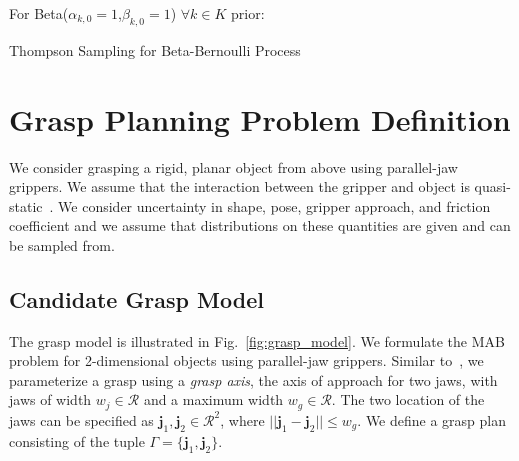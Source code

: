 \documentclass[10pt, conference]{ieeeconf}      %
\begin{document}
\begin{algorithm}
 For Beta($\alpha_{k,0}=1$,$\beta_{k,0}=1$) $\forall k \in K$ prior: \\
 \caption{Thompson Sampling for Beta-Bernoulli Process}
\end{algorithm}
\vspace{-2ex}



\section{Grasp Planning Problem Definition}
We consider grasping a rigid, planar object from above using parallel-jaw grippers.
We assume that the interaction between the gripper and object is quasi-static~\cite{kehoe2012estimating, kehoe2012toward}.
We consider uncertainty in shape, pose, gripper approach, and friction coefficient and we assume that distributions on these quantities are given and can be sampled from. 

\subsection{Candidate Grasp Model}
The grasp model is illustrated in Fig.~\ref{fig:grasp_model}. We formulate the MAB problem for 2-dimensional objects using parallel-jaw grippers. Similar to~\cite{mahler2015gp}, we parameterize a grasp using a {\it grasp axis}, the axis of approach for two jaws,  with jaws of width $w_j \in \mathcal{R}$ and a maximum width $w_g \in \mathcal{R}$. The two location of the jaws can be specified as $\mathbf{j}_1,\mathbf{j}_2 \in \mathcal{R}^2$, where $||\mathbf{j}_1 - \mathbf{j}_2|| \leq w_g$. We define a grasp plan consisting of the tuple $\Gamma = \lbrace \mathbf{j}_1, \mathbf{j}_2 \rbrace$. 
\end{document}
